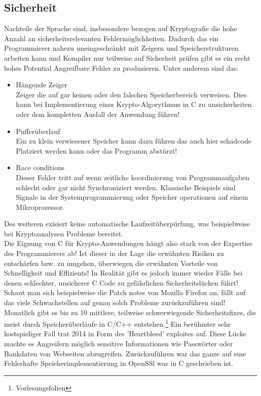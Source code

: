 \documentclass[a4paper,12pt]{scrartcl}
\begin{document}
\subsection{Sicherheit}
Nachteile der Sprache sind, insbesondere bezogen auf Kryptografie die hohe Anzahl an sicherheitsrelevanten Fehlermöglichkeiten. Dadurch das ein Programmierer nahezu uneingeschränkt mit Zeigern und Speicherstrukturen arbeiten kann und Kompiler nur teilweise auf Sicherheit prüfen gibt es ein recht hohes Potential Angreifbare Fehler zu produzieren.
Unter anderem sind das:
\begin{itemize}
 \item Hängende Zeiger\\
 Zeiger die auf gar keinen oder den falschen Speicherbereich verweisen. Dies kann bei Implementierung eines Krypto-Algorythmus in C zu unsicherheiten oder dem kompletten Ausfall der Anwendung führen!
  
 \item Pufferüberlauf\\
  Ein zu klein verwiesener Speicher kann dazu führen das auch hier schadcode Platziert werden kann oder das Programm abstürzt!
  \item Race conditions\\
  Dieser Fehler tritt auf wenn zeitliche koordinierung von Programmaufgaben schlecht oder gar nicht Synchroniziert werden. Klassische Beispiele sind Signale in der Systemprogrammierung oder Speicher operationen auf einem Mikroprozessor.
  
 
\end{itemize}
Des weiteren exisiert keine automatische Laufzeitüberpürfung, was beispielweise bei Kryptoanalysen Probleme bereitet.\\
Die Eignung von C für Krypto-Anwendungen hängt also stark von der Expertise des Programmierers ab! Ist dieser in der Lage die erwähnten Risiken zu entschärfen bzw. zu umgehen, überwiegen die erwähnten Vorteile von Schnelligkeit und Effizients!\newpage
In Realität gibt es jedoch immer wieder Fälle bei denen schlechter, unsicherer C Code zu gefährlichen Sicherheitslücken führt! Schaut man sich beispielweise die Patch notes von Mozilla Firefox an, fällt auf das viele Schwachstellen auf genau solch Probleme zurückzuführen sind! Monatlich gibt es bis zu 10 mittlere, teilweise schwerwiegende Sicherheitsfixes, die meist durch Speicherüberläufe in C/C++ entstehen.\footnote{Vorlesungsfolien}
\newpage
Ein berühmter sehr kostspieliger Fall trat 2014 in Form des 'Heartbleed' exploites auf. Diese Lücke machte es Angreifern möglich sensitive Informationen wie Passwörter oder Bankdaten von Webseiten abzugreifen. Zurückzuführen war das ganze auf eine Fehlerhafte Speicherimplementierung in OpenSSl was in C geschrieben ist. 
\end{document}

